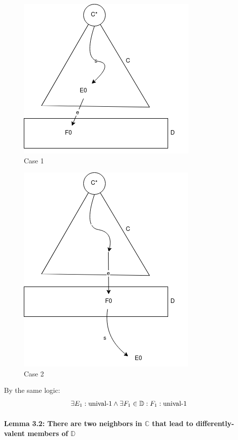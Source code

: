 \begin{figure}
\caption{Case 1}
\includegraphics{images/flp_e0_f0.png}
\end{figure}

\begin{figure}
\caption{Case 2}
\includegraphics{images/flp_f0_e0.png}
\end{figure}

By the same logic: \[
\exists E_1: \text{unival-1} \\
\land \exists F_1 \in \mathbb{D}: F_1: \text{unival-1}
\]

\hypertarget{lemma-3.2-there-are-two-neighbors-in-mathbbc-that-lead-to-differently-valent-members-of-mathbbd}{%
\paragraph{\texorpdfstring{Lemma 3.2: There are two neighbors in
\(\mathbb{C}\) that lead to differently-valent members of
\(\mathbb{D}\)}{Lemma 3.2: There are two neighbors in \textbackslash mathbb\{C\} that lead to differently-valent members of \textbackslash mathbb\{D\}}}\label{lemma-3.2-there-are-two-neighbors-in-mathbbc-that-lead-to-differently-valent-members-of-mathbbd}}

